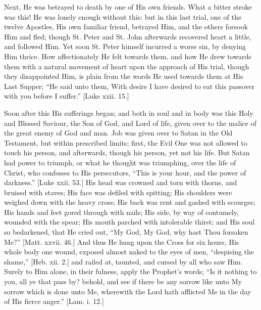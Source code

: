 Next, He was betrayed to death by one of His own friends. What a
bitter stroke was this! He was lonely enough without this: but in this
last trial, one of the twelve Apostles, His own familiar friend,
betrayed Him, and the others forsook Him and fled; though St. Peter and
St. John afterwards recovered heart a little, and followed Him. Yet soon
St. Peter himself incurred a worse sin, by denying Him thrice. How
affectionately He felt towards them, and how He drew towards them with a
natural movement of heart upon the approach of His trial, though they
disappointed Him, is plain from the words He used towards them at His
Last Supper; ``He said unto them, With desire I have desired to eat
this passover with you before I suffer.'' [Luke xxii. 15.]

Soon after this His sufferings began; and both in soul and in body
was this Holy and Blessed Saviour, the Son of God, and Lord of life,
given over to the malice of the great enemy of God and man. Job was
given over to Satan in the Old Testament, but within prescribed limits;
first, the Evil One was not allowed to touch his person, and afterwards,
though his person, yet not his life. But Satan had power to triumph, or
what he thought was triumphing, over the life of Christ, who confesses
to His persecutors, ``This is your hour, and the power of
darkness.'' [Luke xxii. 53.] His head was crowned and torn with
thorns, and bruised with staves; His face was defiled with spitting; His
shoulders were weighed down with the heavy cross; His back was rent and
gashed with scourges; His hands and feet gored through with nails; His
side, by way of contumely, wounded with the spear; His mouth parched
with intolerable thirst; and His soul so bedarkened, that He cried out,
``My God, My God, why hast Thou forsaken Me?'' [Matt. xxvii.
46.] And thus He hung upon the Cross for six hours, His whole body one
wound, exposed almost naked to the eyes of men, ``despising the
shame,'' [Heb. xii. 2.] and railed at, taunted, and cursed by all
who saw Him. Surely to Him alone, in their fulness, apply the Prophet's
words; ``Is it nothing to you, all ye that pass by? behold, and see
if there be any sorrow like unto My sorrow which is done unto Me,
wherewith the Lord hath afflicted Me in the day of His fierce
anger.'' [Lam. i. 12.]

